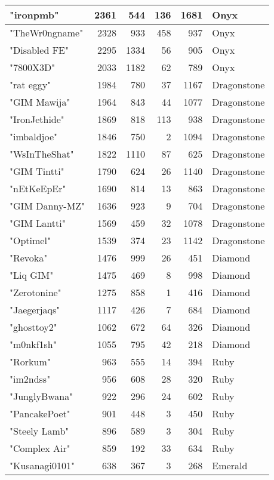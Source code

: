 \documentclass{article}
\begin{document}
\begin{table}[htbp]
\begin{tabular}{|l|r|r|r|r|l|}
"ironpmb" & 2361 & 544 & 136 & 1681 & Onyx \\ \hline
"TheWr0ngname" & 2328 & 933 & 458 & 937 & Onyx \\ \hline
"Disabled FE" & 2295 & 1334 & 56 & 905 & Onyx \\ \hline
"7800X3D" & 2033 & 1182 & 62 & 789 & Onyx \\ \hline
"rat eggy" & 1984 & 780 & 37 & 1167 & Dragonstone \\ \hline
"GIM Mawija" & 1964 & 843 & 44 & 1077 & Dragonstone \\ \hline
"IronJethide" & 1869 & 818 & 113 & 938 & Dragonstone \\ \hline
"imbaldjoe" & 1846 & 750 & 2 & 1094 & Dragonstone \\ \hline
"WsInTheShat" & 1822 & 1110 & 87 & 625 & Dragonstone \\ \hline
"GIM Tintti" & 1790 & 624 & 26 & 1140 & Dragonstone \\ \hline
"nEtKeEpEr" & 1690 & 814 & 13 & 863 & Dragonstone \\ \hline
"GIM Danny-MZ" & 1636 & 923 & 9 & 704 & Dragonstone \\ \hline
"GIM Lantti" & 1569 & 459 & 32 & 1078 & Dragonstone \\ \hline
"Optimel" & 1539 & 374 & 23 & 1142 & Dragonstone \\ \hline
"Revoka" & 1476 & 999 & 26 & 451 & Diamond \\ \hline
"Liq GIM" & 1475 & 469 & 8 & 998 & Diamond \\ \hline
"Zerotonine" & 1275 & 858 & 1 & 416 & Diamond \\ \hline
"Jaegerjaqs" & 1117 & 426 & 7 & 684 & Diamond \\ \hline
"ghosttoy2" & 1062 & 672 & 64 & 326 & Diamond \\ \hline
"m0nkf1sh" & 1055 & 795 & 42 & 218 & Diamond \\ \hline
"Rorkum" & 963 & 555 & 14 & 394 & Ruby \\ \hline
"im2ndss" & 956 & 608 & 28 & 320 & Ruby \\ \hline
"JunglyBwana" & 922 & 296 & 24 & 602 & Ruby \\ \hline
"PancakePoet" & 901 & 448 & 3 & 450 & Ruby \\ \hline
"Steely Lamb" & 896 & 589 & 3 & 304 & Ruby \\ \hline
"Complex Air" & 859 & 192 & 33 & 634 & Ruby \\ \hline
"Kusanagi0101" & 638 & 367 & 3 & 268 & Emerald \\ \hline

\end{tabular}
\end{table}
\end{document}
